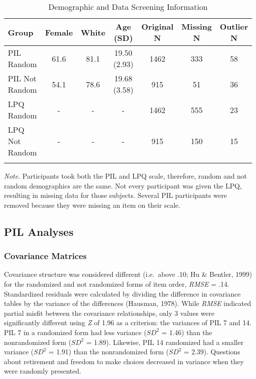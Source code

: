 \documentclass[english,man, mask]{apa6}
\theoremstyle{definition}
\theoremstyle{definition}
\theoremstyle{definition}
\theoremstyle{remark}
\begin{document}
\begin{table}[tbp]
\begin{center}
\begin{threeparttable}
\caption{\label{tab:demo-table}Demographic and Data Screening Information}
\begin{tabular}{lcccccc}
\toprule
Group & \multicolumn{1}{c}{Female} & \multicolumn{1}{c}{White} & \multicolumn{1}{c}{Age (SD)} & \multicolumn{1}{c}{Original N} & \multicolumn{1}{c}{Missing N} & \multicolumn{1}{c}{Outlier N}\\
\midrule
PIL Random & 61.6 & 81.1 & 19.50 (2.93) & 1462 & 333 & 58\\
PIL Not Random & 54.1 & 78.6 & 19.68 (3.58) & 915 & 51 & 36\\
LPQ Random & - & - & - & 1462 & 555 & 23\\
LPQ Not Random & - & - & - & 915 & 150 & 15\\
\bottomrule
\addlinespace
\end{tabular}
\begin{tablenotes}[para]
\textit{Note.} Participants took both the PIL and LPQ scale, therefore, random and not random demographics are the same. Not every participant was given the LPQ, resulting in missing data for those subjects. Several PIL participants were removed because they were missing an item on their scale.
\end{tablenotes}
\end{threeparttable}
\end{center}
\end{table}

\subsection{PIL Analyses}\label{pil-analyses}

\subsubsection{Covariance Matrices}\label{covariance-matrices}

Covariance structure was considered different (i.e.~above .10; Hu \&
Bentler, 1999) for the randomized and not randomized forms of item
order, \emph{RMSE} = .14. Standardized residuals were calculated by
dividing the difference in covariance tables by the variance of the
differences (Hausman, 1978). While \emph{RMSE} indicated partial misfit
between the covariance relationships, only 3 values were significantly
different using \emph{Z} of 1.96 as a criterion: the variances of PIL 7
and 14. PIL 7 in a randomized form had less variance (\(SD^2\) = 1.46)
than the nonrandomized form (\(SD^2\) = 1.89). Likewise, PIL 14
randomized had a smaller variance (\(SD^2\) = 1.91) than the
nonrandomized form (\(SD^2\) = 2.39). Questions about retirement and
freedom to make choices decreased in variance when they were randomly
presented.
\end{document}
